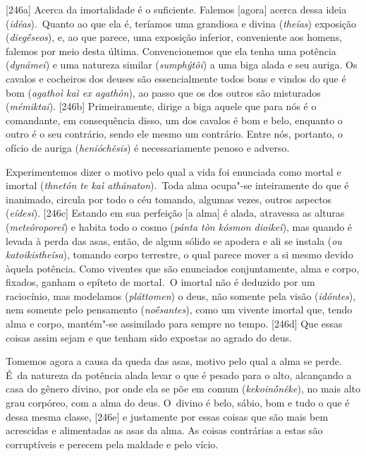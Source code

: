 [246a] Acerca da imortalidade é o suficiente. Falemos [agora]
acerca dessa ideia (\emph{idéas}).~Quanto ao que ela é, teríamos uma
grandiosa e divina (\emph{theías}) exposição (\emph{diegḗseos}), e, ao
que parece, uma exposição inferior, conveniente aos homens, falemos por
meio desta última. Convencionemos que ela tenha uma potência
(\emph{dynámei}) e uma natureza similar (\emph{sumphýtôi}) a uma biga
alada e seu auriga. Os cavalos e cocheiros dos deuses são essencialmente
todos bons e vindos do que é bom (\emph{agathoì kaì ex agathôn}), ao
passo que os dos outros são misturados (\emph{mémiktai}). [246b]
Primeiramente, dirige a biga aquele que para nós é o comandante, em
consequência disso, um dos cavalos é bom e belo, enquanto o outro é o seu
contrário, sendo ele mesmo um contrário. Entre nós, portanto, o ofício
de auriga (\emph{henióchêsis}) é necessariamente penoso e adverso.

Experimentemos dizer o motivo pelo qual a vida foi enunciada como mortal
e imortal (\emph{thnetón te kaì athánaton}).~Toda alma ocupa"-se
inteiramente do que é inanimado, circula por todo o céu tomando, algumas
vezes, outros aspectos (\emph{eídesi}). [246c] Estando em sua
perfeição [a alma] é alada, atravessa as alturas
(\emph{meteôroporeî}) e habita todo o cosmo (\emph{pánta tòn kósmon
dioikeî}), mas quando é levada à perda das asas, então, de algum sólido
se apodera e ali se instala (\emph{ou katoikistheîsa}), tomando corpo
terrestre, o qual parece mover a si mesmo devido àquela potência. Como
viventes que são enunciados conjuntamente, alma e corpo, fixados, ganham
o epíteto de mortal\emph{.~}O imortal não é deduzido por um raciocínio,
mas modelamos (\emph{pláttomen}) o deus, não somente pela visão
(\emph{idóntes}), nem somente pelo pensamento (\emph{noḗsantes}), como
um vivente imortal que, tendo alma e corpo, mantém"-se assimilado para
sempre no tempo. [246d] Que essas coisas assim sejam e que tenham
sido expostas ao agrado do deus.

Tomemos agora a causa da queda das asas, motivo pelo qual a alma se
perde. É~da natureza da potência alada levar o que é pesado para o alto,
alcançando a casa do gênero divino, por onde ela se põe em comum
(\emph{kekoinṓnêke}), no mais alto grau corpóreo, com a alma do deus. O~divino é belo, sábio, bom e tudo o que é dessa mesma classe, [246e]
e justamente por essas coisas que são mais bem acrescidas e alimentadas
as asas da alma. As coisas contrárias a estas são corruptíveis e perecem
pela maldade e pelo vício.

